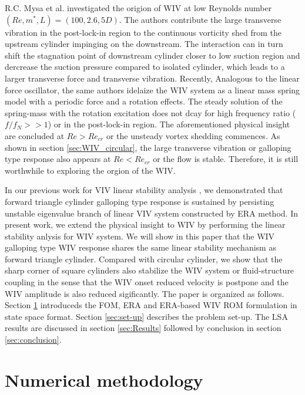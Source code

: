 R.C. Mysa et al.\cite{Mysa2016} investigated the origion of WIV at low Reynolds number $(Re,m^*,L)=(100,2.6,5D)$. 
The authors contribute the large transverse vibration in the post-lock-in region to the 
continuous vorticity shed from the upstream cylinder impinging on the downstream. The interaction 
can in turn shift the stagnation point of downstream cylinder closer to low suction region and 
dercrease the suction pressure compared to isolated cylinder, which leads to a larger transverse force 
and transverse vibration. Recently, Analogous to the linear force  oscillator, the same authors \cite{MYSA201727} idelaize the 
WIV system as a linear mass spring model with a periodic force and a rotation effects. The steady solution 
of the spring-mass with the rotation excitation does not dcay for high frequency ratio ($f/f_N >> 1$) or 
in the post-lock-in region. The aforementioned physical insight are concluded at $Re>Re_{cr}$ or 
the unsteady vortex shedding commences. As shown in section \ref{sec:WIV_circular}, the large transverse 
vibration or galloping type response also appears at $Re<Re_{cr}$ or the flow is stable. Therefore, it is 
still worthwhile to exploring the orgion of the WIV. 

In our previous work for VIV linear stability analysis \cite{yao_jfm_1}, we demonstrated that 
forward triangle cylinder galloping type response is sustained by persisting unstable eigenvalue branch 
of linear VIV system constructed by ERA method. In present work, we extend the physical insight to 
WIV by performing the linear stability anlysis for WIV system. We will show in this paper that the WIV 
galloping type WIV response shares the same linear stability mechanism as forward triangle cylinder. 
Compared with circular cylinder, we show that the sharp corner of square cylinders also stabilize the WIV 
system or fluid-structure coupling in the sense that the WIV onset reduced velocity is postpone and the WIV
amplitude is also reduced sigificantly. 
The paper is organized as follows. Section  \ref{sec:Numeric method} introduceds the FOM, ERA and ERA-based WIV ROM 
formulation in state space format. Section \ref{sec:set-up} describes the problem set-up. The LSA results are discussed 
in section \ref{sec:Results} followed by conclusion in section \ref{sec:conclusion}. 

\section{Numerical methodology}\label{sec:Numeric method}
